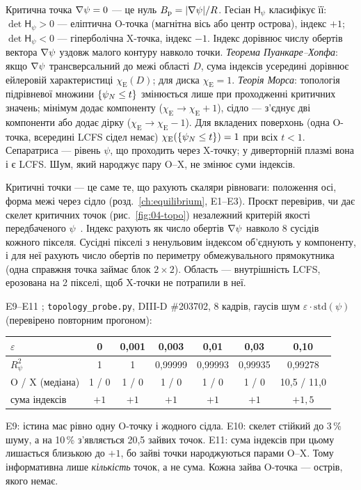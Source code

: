 \begin{outofcorpus}
Критична точка $\nabla\psi=0$ --- це нуль $B_{\mathrm{p}}=|\nabla\psi|/R$. Гесіан $\mathsf{H}_\psi$ класифікує її: $\det\mathsf{H}_\psi>0$ --- еліптична O-точка (магнітна вісь або центр острова), індекс $+1$; $\det\mathsf{H}_\psi<0$ --- гіперболічна X-точка, індекс $-1$. Індекс дорівнює числу обертів вектора $\nabla\psi$ уздовж малого контуру навколо точки. \emph{Теорема Пуанкаре--Хопфа}: якщо $\nabla\psi$ трансверсальний до межі області $D$, сума індексів усередині дорівнює ейлеровій характеристиці $\chi_{\mathrm{E}}(D)$; для диска $\chi_{\mathrm{E}}=1$. \emph{Теорія Морса}: топологія підрівневої множини $\{\psi_{N}\le t\}$ змінюється лише при проходженні критичних значень; мінімум додає компоненту ($\chi_{\mathrm{E}}\to\chi_{\mathrm{E}}+1$), сідло --- з'єднує дві компоненти або додає дірку ($\chi_{\mathrm{E}}\to\chi_{\mathrm{E}}-1$). Для вкладених поверхонь (одна O-точка, всередині LCFS сідел немає) $\chi_{\mathrm{E}}(\{\psi_{N}\le t\})=1$ при всіх $t<1$. Сепаратриса --- рівень $\psi$, що проходить через X-точку; у диверторній плазмі вона і є LCFS. Шум, який народжує пару O--X, не змінює суми індексів.
\end{outofcorpus}

Критичні точки --- це саме те, що рахують скаляри рівноваги: положення осі, форма межі через сідло (розд.~\ref{ch:equilibrium}, E1--E3). Проєкт перевірив, чи дає скелет критичних точок (рис.~\ref{fig:04-topo}) незалежний критерій якості передбаченого $\psi$~\cite{ProjRegisters,FEC2026}. Індекс рахують як число обертів $\nabla\psi$ навколо 8 сусідів кожного пікселя. Сусідні пікселі з ненульовим індексом об'єднують у компоненту, і для неї рахують число обертів по периметру обмежувального прямокутника (одна справжня точка займає блок $2\times2$). Область --- внутрішність LCFS, ерозована на 2 пікселі, щоб X-точки не потрапили в неї.

\begin{established}{E9--E11}
\cite{ProjRegisters}; \texttt{topology\_probe.py}, DIII-D \#203702, 8 кадрів, гаусів шум $\varepsilon\cdot\mathrm{std}(\psi)$ (перевірено повторним прогоном):
\begin{center}\small
\begin{tabular}{@{}lcccccc@{}}\toprule
$\varepsilon$ & 0 & 0,001 & 0,003 & 0,01 & 0,03 & 0,10\\\midrule
$R^2_\psi$ & 1 & 1 & 0,99999 & 0,99993 & 0,99935 & 0,99278\\
O / X (медіана) & 1 / 0 & 1 / 0 & 1 / 0 & 1 / 0 & 1 / 0 & 10,5 / 11,0\\
сума індексів & $+1$ & $+1$ & $+1$ & $+1$ & $+1$ & $+1{,}5$\\\bottomrule
\end{tabular}
\end{center}
E9: істина має рівно одну O-точку і жодного сідла. E10: скелет стійкий до 3\,\% шуму, а на 10\,\% з'являється 20,5 зайвих точок. E11: сума індексів при цьому лишається близькою до $+1$, бо зайві точки народжуються парами O--X. Тому інформативна лише \emph{кількість} точок, а не сума. Кожна зайва O-точка --- острів, якого немає.
\end{established}

